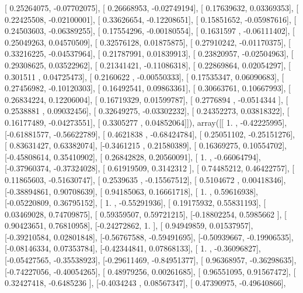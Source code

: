 \documentclass{article}
\begin{document}
       [ 0.25264075, -0.07702075],
       [ 0.26668953, -0.02749194],
       [ 0.17639632,  0.03369353],
       [ 0.22425508, -0.02100001],
       [ 0.33626654, -0.12208651],
       [ 0.15851652, -0.05987616],
       [ 0.24503603, -0.06389255],
       [ 0.17554296, -0.00180554],
       [ 0.1631597 , -0.06111402],
       [ 0.25049263,  0.04570509],
       [ 0.32576128,  0.01875875],
       [ 0.27910242, -0.01170375],
       [ 0.33216225, -0.04537964],
       [ 0.21787991,  0.01839913],
       [ 0.23820957, -0.02504963],
       [ 0.29308625,  0.03522962],
       [ 0.21341421, -0.11086318],
       [ 0.22869864,  0.02054297],
       [ 0.301511  ,  0.04725473],
       [ 0.2160622 , -0.00550333],
       [ 0.17535347,  0.06090683],
       [ 0.27456982, -0.10120303],
       [ 0.16492541,  0.09863361],
       [ 0.30663761,  0.10667993],
       [ 0.26834224,  0.12206004],
       [ 0.16719329,  0.01599787],
       [ 0.2776894 , -0.0514344 ],
       [ 0.2538881 ,  0.09032456],
       [ 0.32649275, -0.03302232],
       [ 0.24352273,  0.03818322],
       [ 0.16177489, -0.04273551],
       [ 0.3305277 ,  0.04852064]]), array([[ 1.        , -0.42225995],
       [-0.61881577, -0.56622789],
       [ 0.4621838 , -0.68424784],
       [ 0.25051102, -0.25151276],
       [ 0.83631427,  0.63382074],
       [-0.3461215 ,  0.21580389],
       [ 0.16369275,  0.10554702],
       [-0.45808614,  0.35410902],
       [ 0.26842828,  0.20560091],
       [ 1.        , -0.66064794],
       [-0.37960374, -0.37324028],
       [ 0.61919509,  0.3142312 ],
       [ 0.74485212,  0.46422757],
       [ 0.11865603, -0.51630747],
       [ 0.2539635 , -0.15567512],
       [ 0.5104672 ,  0.00418346],
       [-0.38894861,  0.90708639],
       [ 0.94185063,  0.16661718],
       [ 1.        ,  0.59616938],
       [-0.05220809,  0.36795152],
       [ 1.        , -0.55291936],
       [ 0.19175932,  0.55831193],
       [ 0.03469028,  0.74709875],
       [ 0.59359507,  0.59721215],
       [-0.18802254,  0.5985662 ],
       [ 0.90423651,  0.76810958],
       [-0.24272862,  1.        ],
       [ 0.94949859,  0.01537957],
       [-0.39210584,  0.02801848],
       [-0.56767588, -0.59491695],
       [-0.50939667, -0.19906535],
       [-0.08146334,  0.07353784],
       [-0.42344841,  0.07868133],
       [ 1.        , -0.36096827],
       [-0.05427565, -0.35538923],
       [-0.29611469, -0.84951377],
       [ 0.96368957, -0.36298635],
       [-0.74227056, -0.40054265],
       [ 0.48979256,  0.00261685],
       [ 0.96551095,  0.91567472],
       [ 0.32427418, -0.6485236 ],
       [-0.4034243 ,  0.08567347],
       [ 0.47390975, -0.49640866],
\end{document}
